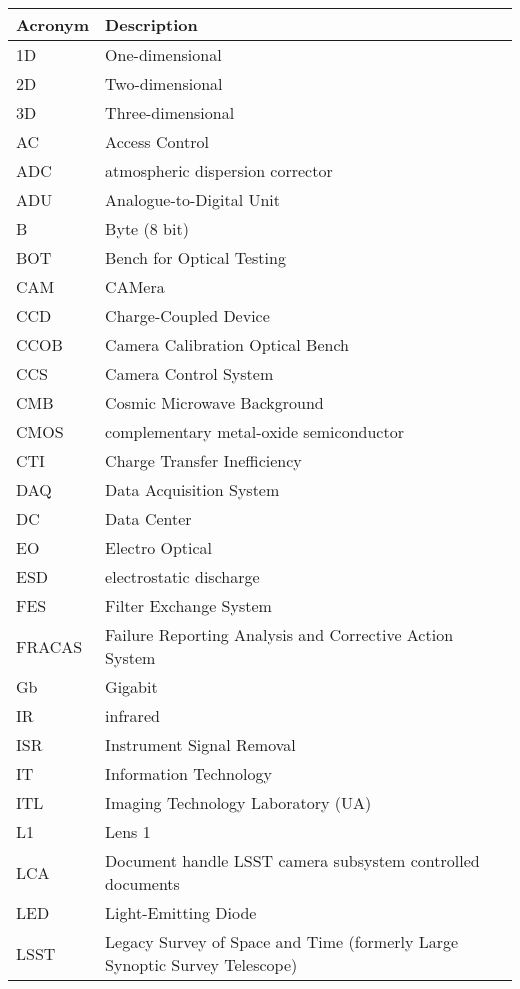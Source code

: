 \addtocounter{table}{-1}
\begin{longtable}{p{}p{}}\hline
\textbf{Acronym} & \textbf{Description}  \\\hline

1D & One-dimensional \\\hline
2D & Two-dimensional \\\hline
3D & Three-dimensional \\\hline
AC & Access Control \\\hline
ADC & atmospheric dispersion corrector \\\hline
ADU & Analogue-to-Digital Unit \\\hline
B & Byte (8 bit) \\\hline
BOT & Bench for Optical Testing \\\hline
CAM & CAMera \\\hline
CCD & Charge-Coupled Device \\\hline
CCOB & Camera Calibration Optical Bench \\\hline
CCS & Camera Control System \\\hline
CMB & Cosmic Microwave Background \\\hline
CMOS & complementary metal-oxide semiconductor \\\hline
CTI & Charge Transfer Inefficiency \\\hline
DAQ & Data Acquisition System \\\hline
DC & Data Center \\\hline
EO & Electro Optical \\\hline
ESD & electrostatic discharge \\\hline
FES & Filter Exchange System \\\hline
FRACAS & Failure Reporting Analysis and Corrective Action System \\\hline
Gb & Gigabit \\\hline
IR & infrared \\\hline
ISR & Instrument Signal Removal \\\hline
IT & Information Technology \\\hline
ITL & Imaging Technology Laboratory (UA) \\\hline
L1 & Lens 1 \\\hline
LCA & Document handle LSST camera subsystem controlled documents \\\hline
LED & Light-Emitting Diode \\\hline
LSST & Legacy Survey of Space and Time (formerly Large Synoptic Survey Telescope) \\\hline

\end{longtable}

